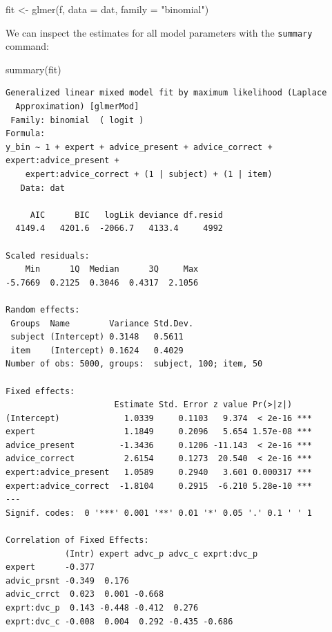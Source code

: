 \documentclass[
  man,
  floatsintext,
  longtable,
  a4paper,
  nolmodern,
  notxfonts,
  notimes,
  colorlinks=true,linkcolor=blue,citecolor=blue,urlcolor=blue]{apa7}
\newenvironment{Shaded}{\begin{snugshade}}{\end{snugshade}}
\newcommand{\AttributeTok}[1]{\textcolor[rgb]{0.40,0.45,0.13}{#1}}
\newcommand{\FunctionTok}[1]{\textcolor[rgb]{0.28,0.35,0.67}{#1}}
\newcommand{\NormalTok}[1]{\textcolor[rgb]{0.00,0.23,0.31}{#1}}
\newcommand{\OtherTok}[1]{\textcolor[rgb]{0.00,0.23,0.31}{#1}}
\newcommand{\StringTok}[1]{\textcolor[rgb]{0.13,0.47,0.30}{#1}}
\begin{document}
\begin{Shaded}
\begin{Highlighting}[]
\NormalTok{fit }\OtherTok{\textless{}{-}} \FunctionTok{glmer}\NormalTok{(f, }\AttributeTok{data =}\NormalTok{ dat, }\AttributeTok{family =} \StringTok{"binomial"}\NormalTok{)}
\end{Highlighting}
\end{Shaded}

We can inspect the estimates for all model parameters with the
\texttt{summary} command:

\begin{Shaded}
\begin{Highlighting}[]
\FunctionTok{summary}\NormalTok{(fit)}
\end{Highlighting}
\end{Shaded}

\begin{verbatim}
Generalized linear mixed model fit by maximum likelihood (Laplace
  Approximation) [glmerMod]
 Family: binomial  ( logit )
Formula: 
y_bin ~ 1 + expert + advice_present + advice_correct + expert:advice_present +  
    expert:advice_correct + (1 | subject) + (1 | item)
   Data: dat

     AIC      BIC   logLik deviance df.resid 
  4149.4   4201.6  -2066.7   4133.4     4992 

Scaled residuals: 
    Min      1Q  Median      3Q     Max 
-5.7669  0.2125  0.3046  0.4317  2.1056 

Random effects:
 Groups  Name        Variance Std.Dev.
 subject (Intercept) 0.3148   0.5611  
 item    (Intercept) 0.1624   0.4029  
Number of obs: 5000, groups:  subject, 100; item, 50

Fixed effects:
                      Estimate Std. Error z value Pr(>|z|)    
(Intercept)             1.0339     0.1103   9.374  < 2e-16 ***
expert                  1.1849     0.2096   5.654 1.57e-08 ***
advice_present         -1.3436     0.1206 -11.143  < 2e-16 ***
advice_correct          2.6154     0.1273  20.540  < 2e-16 ***
expert:advice_present   1.0589     0.2940   3.601 0.000317 ***
expert:advice_correct  -1.8104     0.2915  -6.210 5.28e-10 ***
---
Signif. codes:  0 '***' 0.001 '**' 0.01 '*' 0.05 '.' 0.1 ' ' 1

Correlation of Fixed Effects:
            (Intr) expert advc_p advc_c exprt:dvc_p
expert      -0.377                                 
advic_prsnt -0.349  0.176                          
advic_crrct  0.023  0.001 -0.668                   
exprt:dvc_p  0.143 -0.448 -0.412  0.276            
exprt:dvc_c -0.008  0.004  0.292 -0.435 -0.686     
\end{verbatim}
\end{document}
